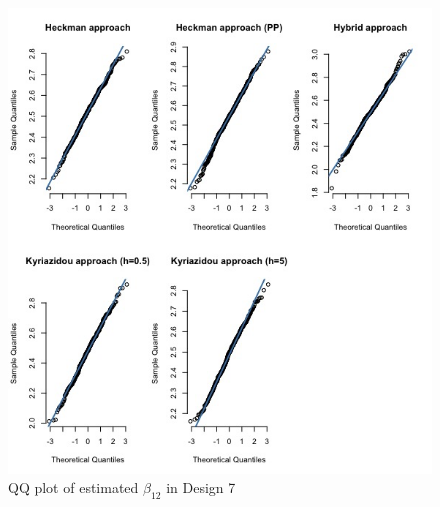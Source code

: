 \begin{figure}[htbp]
    \vspace{-2.5em}%
    \begin{adjustwidth}{-.5in}{-.5in}
        \centerline{\includegraphics[scale=.4]{content/Figures/QQ_beta_12_Design7.png}}
        \caption{\footnotesize{QQ plot of estimated $\beta_{12}$ in Design 7}}
        \label{QQ_beta_12_Design7}
    \end{adjustwidth}
\end{figure}

